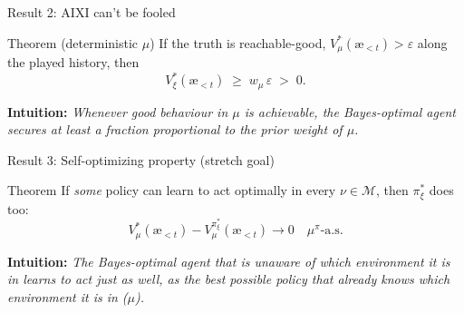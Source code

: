 \documentclass[10pt,aspectratio=169]{beamer}
\newcommand{\cM}{\mathcal{M}}
\newcommand{\aes}{{\text{\ae}}}            %
\begin{document}
\begin{frame}{Result 2: AIXI can't be fooled}
\begin{block}{Theorem (deterministic $\mu$)}
If the truth is reachable-good, $V_\mu^*(\aes_{<t}) > \varepsilon$ along the played history, then
\[
V_\xi^*(\aes_{<t}) \;\geq\; w_\mu\,\varepsilon \;>\; 0 .
\]
\end{block}
\pause
\textbf{Intuition:} \emph{Whenever good behaviour in $\mu$ is achievable,
the Bayes-optimal agent secures at least a fraction proportional to the prior weight of $\mu$.}
\end{frame}

\begin{frame}{Result 3: Self-optimizing property (stretch goal)}
\begin{block}{Theorem}
If \emph{some} policy can learn to act optimally in every $\nu\in\cM$, then $\pi_\xi^*$ does too:
\[
V_\mu^*(\aes_{<t}) - V_\mu^{\pi_\xi^*}(\aes_{<t}) \to 0 \quad \mu^\pi\text{-a.s.}
\]
\end{block}
\pause
\textbf{Intuition:} \emph{The Bayes-optimal agent that is unaware of which environment it is in learns to act
just as well, as the best possible policy that already knows which environment it is in ($\mu$).}
\end{frame}
\end{document}
